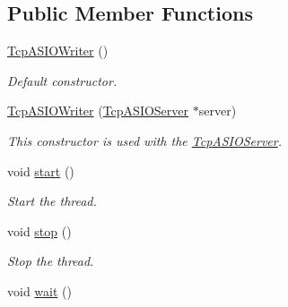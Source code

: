 \subsection*{Public Member Functions}
\begin{DoxyCompactItemize}
\item 
\hypertarget{classmognetwork_1_1_tcp_a_s_i_o_writer_ad9ccc4046f754b839e79263c54baa3d6}{\hyperlink{classmognetwork_1_1_tcp_a_s_i_o_writer_ad9ccc4046f754b839e79263c54baa3d6}{Tcp\-A\-S\-I\-O\-Writer} ()}\label{classmognetwork_1_1_tcp_a_s_i_o_writer_ad9ccc4046f754b839e79263c54baa3d6}

\begin{DoxyCompactList}\small\item\em Default constructor. \end{DoxyCompactList}\item 
\hyperlink{classmognetwork_1_1_tcp_a_s_i_o_writer_a953bc7b6fa55076b6f5d678272678344}{Tcp\-A\-S\-I\-O\-Writer} (\hyperlink{classmognetwork_1_1_tcp_a_s_i_o_server}{Tcp\-A\-S\-I\-O\-Server} $\ast$server)
\begin{DoxyCompactList}\small\item\em This constructor is used with the \hyperlink{classmognetwork_1_1_tcp_a_s_i_o_server}{Tcp\-A\-S\-I\-O\-Server}. \end{DoxyCompactList}\item 
\hypertarget{classmognetwork_1_1_tcp_a_s_i_o_writer_ac7adf2ec565c463b28f7b584be565863}{void \hyperlink{classmognetwork_1_1_tcp_a_s_i_o_writer_ac7adf2ec565c463b28f7b584be565863}{start} ()}\label{classmognetwork_1_1_tcp_a_s_i_o_writer_ac7adf2ec565c463b28f7b584be565863}

\begin{DoxyCompactList}\small\item\em Start the thread. \end{DoxyCompactList}\item 
\hypertarget{classmognetwork_1_1_tcp_a_s_i_o_writer_a72d4c74cb2fb05c23f6245de796a0928}{void \hyperlink{classmognetwork_1_1_tcp_a_s_i_o_writer_a72d4c74cb2fb05c23f6245de796a0928}{stop} ()}\label{classmognetwork_1_1_tcp_a_s_i_o_writer_a72d4c74cb2fb05c23f6245de796a0928}

\begin{DoxyCompactList}\small\item\em Stop the thread. \end{DoxyCompactList}\item 
\hypertarget{classmognetwork_1_1_tcp_a_s_i_o_writer_ad3bd21b81839315d4409914f30de8652}{void \hyperlink{classmognetwork_1_1_tcp_a_s_i_o_writer_ad3bd21b81839315d4409914f30de8652}{wait} ()}\label{classmognetwork_1_1_tcp_a_s_i_o_writer_ad3bd21b81839315d4409914f30de8652}


\end{DoxyCompactItemize}

